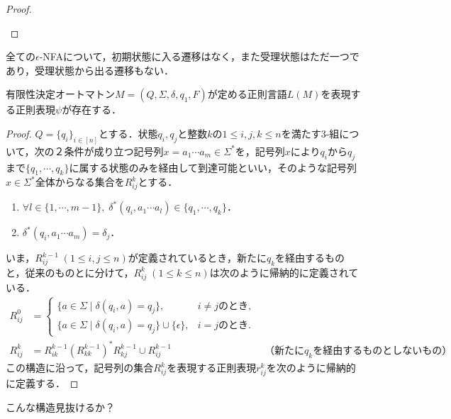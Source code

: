 \documentclass[uplatex, dvipdfmx]{jsreport}
\begin{document}
\begin{proof}
\begin{enumerate}
\begin{center}
        \end{center}
    \end{enumerate}
\end{proof}
\begin{remarks}
    全ての$\epsilon$-NFAについて，初期状態に入る遷移はなく，また受理状態はただ一つであり，受理状態から出る遷移もない．
\end{remarks}

\begin{theorem}
    有限性決定オートマトン$M=(Q,\Sigma,\delta,q_1,F)$が定める正則言語$L(M)$を表現する正則表現$\psi$が存在する．
\end{theorem}
\begin{proof}
    $Q=\{q_i\}_{i\in[n]}$とする．状態$q_i,q_j$と整数$k$の$1\le i,j,k\le n$を満たす3-組について，次の２条件が成り立つ記号列$x=a_1\cdots a_m\in\Sigma^*$を，記号列$x$により$q_i$から$q_j$まで$\{q_1,\cdots,q_k\}$に属する状態のみを経由して到達可能といい，そのような記号列$x\in\Sigma^*$全体からなる集合を$R^k_{ij}$とする．
    \begin{enumerate}
        \item $\forall l\in\{1,\cdots,m-1\},\;\delta^*(q_i,a_1\cdots a_l)\in\{q_1,\cdots,q_k\}$．
        \item $\delta^*(q_i,a_1\cdots a_m)=\delta_j$．
    \end{enumerate}
    いま，$R^{k-1}_{ij}\;(1\le i,j\le n)$が定義されているとき，新たに$q_k$を経由するものと，従来のものとに分けて，$R^k_{ij}\;(1\le k\le n)$は次のように帰納的に定義されている．
    \begin{align*}
        R^0_{ij}&=\begin{cases}
            \{a\in\Sigma\mid \delta(q_i,a)=q_j\},&i\ne jのとき,\\
            \{a\in\Sigma\mid \delta(q_i,a)=q_j\}\cup\{\epsilon\},&i=jのとき.
        \end{cases}\\
        R^k_{ij}&=R^{k-1}_{ik}(R^{k-1}_{kk})^*R^{k-1}_{kj}\cup R^{k-1}_{ij}&（新たにq_kを経由するものとしないもの）
    \end{align*}
    この構造に沿って，記号列の集合$R^k_{ij}$を表現する正則表現$r^k_{ij}$を次のように帰納的に定義する．
\end{proof}
\begin{remarks}
    こんな構造見抜けるか？
\end{remarks}
\end{document}
